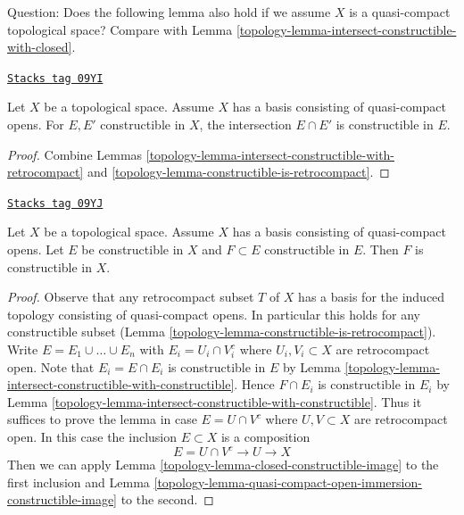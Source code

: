 Question: Does the following lemma also hold if we assume $X$ is a
quasi-compact topological space? Compare with
Lemma \ref{topology-lemma-intersect-constructible-with-closed}.

\begin{lemma}
\label{topology-lemma-intersect-constructible-with-constructible}
\href{https://stacks.math.columbia.edu/tag/09YI}{\texttt{Stacks tag 09YI}}

Let $X$ be a topological space. Assume
$X$ has a basis consisting of quasi-compact opens.
For $E, E'$ constructible in $X$, the intersection
$E \cap E'$ is constructible in $E$.
\end{lemma}

\begin{proof}

Combine Lemmas \ref{topology-lemma-intersect-constructible-with-retrocompact} and
\ref{topology-lemma-constructible-is-retrocompact}.
\end{proof}

\begin{lemma}
\label{topology-lemma-constructible-in-constructible}
\href{https://stacks.math.columbia.edu/tag/09YJ}{\texttt{Stacks tag 09YJ}}

Let $X$ be a topological space. Assume
$X$ has a basis consisting of quasi-compact opens.
Let $E$ be constructible in $X$ and $F \subset E$ constructible in $E$.
Then $F$ is constructible in $X$.
\end{lemma}

\begin{proof}

Observe that any retrocompact subset $T$ of $X$ has a basis for the induced
topology consisting of quasi-compact opens. In particular this holds
for any constructible subset
(Lemma \ref{topology-lemma-constructible-is-retrocompact}).
Write $E = E_1 \cup \ldots \cup E_n$ with $E_i = U_i \cap V_i^c$
where $U_i, V_i \subset X$ are retrocompact open.
Note that $E_i = E \cap E_i$ is constructible in $E$ by
Lemma \ref{topology-lemma-intersect-constructible-with-constructible}.
Hence $F \cap E_i$ is constructible in $E_i$ by
Lemma \ref{topology-lemma-intersect-constructible-with-constructible}.
Thus it suffices to prove the lemma in case $E = U \cap V^c$
where $U, V \subset X$ are retrocompact open.
In this case the inclusion $E \subset X$ is a composition
$$
E = U \cap V^c \to U \to X
$$
Then we can apply Lemma \ref{topology-lemma-closed-constructible-image}
to the first inclusion and
Lemma \ref{topology-lemma-quasi-compact-open-immersion-constructible-image}
to the second.
\end{proof}

